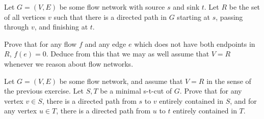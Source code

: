 \documentclass[nobib]{tufte-handout}
\begin{document}
\begin{xca}
    Let $G = (V,E)$ be some flow network with source $s$ and sink $t$. Let $R$ be the set of all vertices $v$ such that there is a directed path in $G$ starting at $s$, passing through $v$, and finishing at $t$.
    
    Prove that for any flow $f$ and any edge $e$ which does not have both endpoints in $R$, $f(e) = 0$. Deduce from this that we may as well assume that $V = R$ whenever we reason about flow networks.
\end{xca}

\begin{xca}
    Let $G = (V,E)$ be some flow network, and assume that $V = R$ in the sense of the previous exercise. Let $S, T$ be a minimal s-t-cut of $G$. Prove that for any vertex $v \in S$, there is a directed path from $s$ to $v$ entirely contained in $S$, and for any vertex $u \in T$, there is a directed path from $u$ to $t$ entirely contained in $T$.
\end{xca}

%
%
\end{document}
